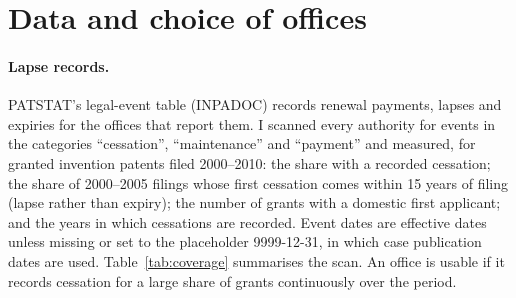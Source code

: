 \section{Data and choice of offices}\label{app:data}

\paragraph{Lapse records.} PATSTAT's legal-event table (INPADOC) records renewal payments, lapses and expiries for
the offices that report them. I scanned every authority for events in the categories ``cessation'', ``maintenance''
and ``payment'' and measured, for granted invention patents filed 2000--2010: the share with a recorded cessation;
the share of 2000--2005 filings whose first cessation comes within 15 years of filing (lapse rather than expiry);
the number of grants with a domestic first applicant; and the years in which cessations are recorded. Event dates
are effective dates unless missing or set to the placeholder 9999-12-31, in which case publication dates are used.
Table~\ref{tab:coverage} summarises the scan. An office is usable if it records cessation for a large share of grants
continuously over the period.

